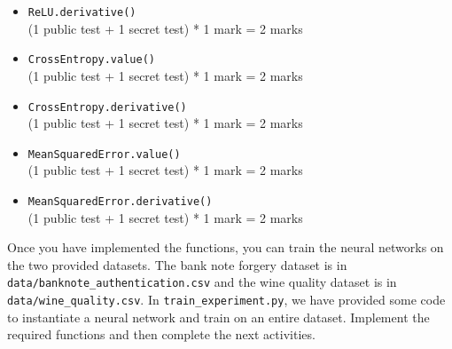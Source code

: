 \documentclass[12pt]{article}
\begin{document}
\begin{enumerate}[font=\Large,label=(\alph*)]
\begin{markscheme}
\begin{itemize}
    \item \verb+ReLU.derivative()+ \\
    (1 public test + 1 secret test) * 1 mark = 2 marks
    
    
    
    \item \verb+CrossEntropy.value()+ \\
    (1 public test + 1 secret test) * 1 mark = 2 marks
    
    \item \verb+CrossEntropy.derivative()+ \\
    (1 public test + 1 secret test) * 1 mark = 2 marks
    
    \item \verb+MeanSquaredError.value()+ \\
    (1 public test + 1 secret test) * 1 mark = 2 marks
    
    \item \verb+MeanSquaredError.derivative()+ \\
    (1 public test + 1 secret test) * 1 mark = 2 marks
    
    
\end{itemize}
    
\end{markscheme}

\vspace{5pt}
Once you have implemented the functions, you can train the neural networks on the two provided datasets. The bank note forgery dataset is in \\ \texttt{data/banknote\_authentication.csv} and the wine quality dataset is in \\  \texttt{data/wine\_quality.csv}. In \verb+train_experiment.py+, we have provided some code to instantiate a neural network and train on an entire dataset. Implement the required functions and then complete the next activities.


\end{enumerate}
\end{document}
